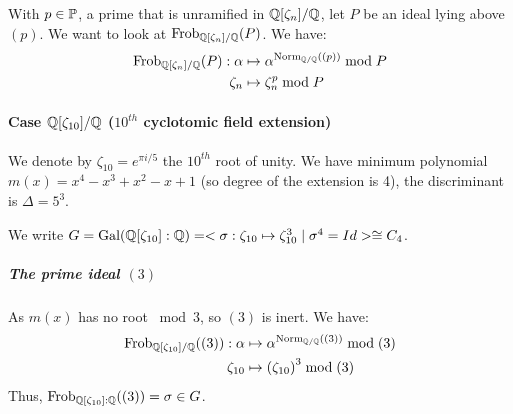 With $p \in \primes$, a prime that is unramified in $\Q[\zeta_n]/\Q$, let $P$ be an ideal lying above $(p)$.
We want to look at $\Frob{\Q[\zeta_n]/\Q}{P}$.
We have:
\begin{align*}
	\Frob{\Q[\zeta_n]/\Q}{P}: 
	\alpha&\mapsto \alpha^{\Norm[\Q/\Q]{(p)}} \bmod P\\
	\zeta_n&\mapsto \zeta_n^p \bmod P
\end{align*}

\paragraph{Case $\Q[\zeta_{10}]/\Q$ ($10^{th}$ cyclotomic field extension)}
We denote by $\zeta_{10}=e^{\pi i/5}$ the $10^{th}$ root of unity.
We have minimum polynomial $m(x) = x^4-x^3+x^2-x+1$ (so degree of the extension is 4), the discriminant is $\Delta = 5^3$.

We write $
G = \Gal{\Q[\zeta_{10}]:\Q} 
= < \sigma: \zeta_{10} \mapsto \zeta_{10}^3 \mid \sigma^4 = Id > \cong C_4$.




\subparagraph{The prime ideal $(3)$}
As $m(x)$ has no root $\bmod 3$, so $(3)$ is inert.
We have:
\begin{align*}
	\Frob{\Q[\zeta_{10}]/\Q}{(3)}:
	\alpha   &\mapsto \alpha^{\Norm[\Q/\Q]{(3)}} \bmod (3)\\
	\zeta_{10} &\mapsto \left( \zeta_{10} \right)^3 \bmod (3)
\end{align*}
Thus, $\Frob{\Q[\zeta_{10}]:\Q}{(3)} = \sigma \in G$.

